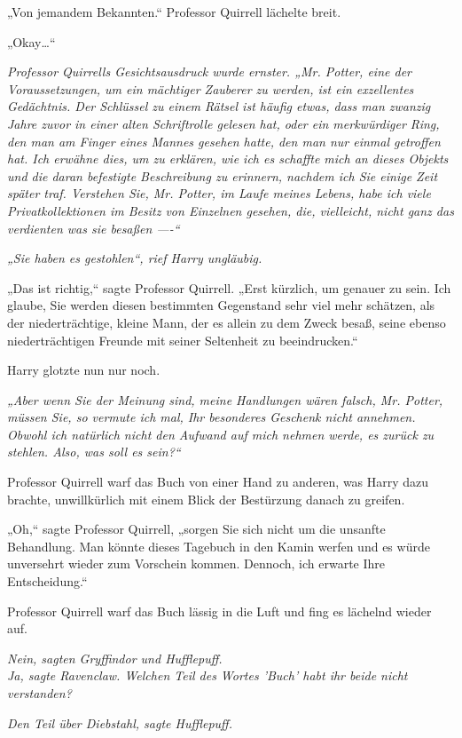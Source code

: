 {„Von jemandem Bekannten.“ Professor Quirrell lächelte breit.

„Okay…“

\emph{Professor Quirrells Gesichtsausdruck wurde ernster. „Mr. Potter, eine der Voraussetzungen, um ein mächtiger Zauberer zu werden, ist ein exzellentes Gedächtnis. Der Schlüssel zu einem Rätsel ist häufig etwas, dass man zwanzig Jahre zuvor in einer alten Schriftrolle gelesen hat, oder ein merkwürdiger Ring, den man am Finger eines Mannes gesehen hatte, den man nur einmal getroffen hat. Ich erwähne dies, um zu erklären, wie ich es schaffte mich an dieses Objekts und die daran befestigte Beschreibung zu erinnern, nachdem ich Sie einige Zeit später traf. Verstehen Sie, Mr. Potter, im Laufe meines Lebens, habe ich viele Privatkollektionen im Besitz von Einzelnen gesehen, die, vielleicht, nicht ganz das verdienten was sie besaßen ----“}

\emph{„Sie haben es gestohlen“, rief Harry ungläubig.}

„Das ist richtig,“ sagte Professor Quirrell. „Erst kürzlich, um genauer zu sein. Ich glaube, Sie werden diesen bestimmten Gegenstand sehr viel mehr schätzen, als der niederträchtige, kleine Mann, der es allein zu dem Zweck besaß, seine ebenso niederträchtigen Freunde mit seiner Seltenheit zu beeindrucken.“

Harry glotzte nun nur noch.

\emph{„Aber wenn Sie der Meinung sind, meine Handlungen wären falsch, Mr. Potter, müssen Sie, so vermute ich mal, Ihr besonderes Geschenk nicht annehmen. Obwohl ich natürlich nicht den Aufwand auf mich nehmen werde, es zurück zu stehlen. Also, was soll es sein?“}

Professor Quirrell warf das Buch von einer Hand zu anderen, was Harry dazu brachte, unwillkürlich mit einem Blick der Bestürzung danach zu greifen.

„Oh,“ sagte Professor Quirrell, „sorgen Sie sich nicht um die unsanfte Behandlung. Man könnte dieses Tagebuch in den Kamin werfen und es würde unversehrt wieder zum Vorschein kommen. Dennoch, ich erwarte Ihre Entscheidung.“

Professor Quirrell warf das Buch lässig in die Luft und fing es lächelnd wieder auf.

\emph{Nein, sagten Gryffindor und Hufflepuff.}\\ \emph{Ja, sagte Ravenclaw. Welchen Teil des Wortes 'Buch' habt ihr beide nicht verstanden?}

\emph{Den Teil über Diebstahl, sagte Hufflepuff.}

}
